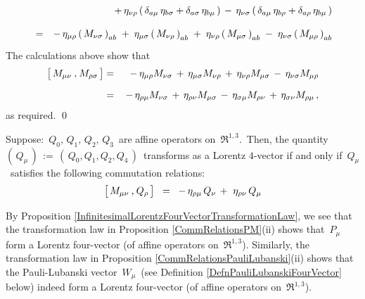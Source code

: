 \begin{enumerate}
\begin{eqnarray*}
	& &
		+\,
		\eta_{\nu\rho}\left(\,
			\delta_{a\mu}\,\eta_{b\sigma}
			+
			\delta_{a\sigma}\,\eta_{b\mu}
			\,\right)
		\,-\,
		\eta_{\nu\sigma}\left(\,
			\delta_{a\mu}\,\eta_{b\rho}
			+
			\delta_{a\rho}\,\eta_{b\mu}
			\,\right)
	\\
	& \overset{{\color{white}\textnormal{\Large$1$}}}{=} &
		-\,\eta_{\mu\rho}\left(\,M_{\nu\sigma}\,\right)_{ab}
		\;+\;
		\eta_{\mu\sigma}\left(\,M_{\nu\rho}\,\right)_{ab}
		\;+\;
		\eta_{\nu\rho}\left(\,M_{\mu\sigma}\,\right)_{ab}
		\;-\;
		\eta_{\nu\sigma}\left(\,M_{\mu\rho}\,\right)_{ab}
	\end{eqnarray*}
	The calculations above show that
	\begin{eqnarray*}
	\left[\,
		M_{\mu\nu}
		\,\overset{{\color{white}1}}{,}\,
		M_{\rho\sigma}
		\,\right]
	& = &
		\,-\,
		\eta_{\mu\rho}M_{\nu\sigma}
		\,+\,
		\eta_{\mu\sigma}M_{\nu\rho}
		\,+\,
		\eta_{\nu\rho}M_{\mu\sigma}
		\,-\,
		\eta_{\nu\sigma}M_{\mu\rho}
	\\
	& \overset{{\color{white}\textnormal{\large$1$}}}{=} &
		\,-\,
		\eta_{\rho\mu}M_{\nu\sigma}
		\,+\,
		\eta_{\rho\nu}M_{\mu\sigma}
		\,-\,
		\eta_{\sigma\mu}M_{\rho\nu}
		\,+\,
		\eta_{\sigma\nu}M_{\rho\mu}\,,
	\end{eqnarray*}
	as required.
	\qed
\end{enumerate}

\vskip 0.5cm
\begin{proposition}
\label{InfinitesimalLorentzFourVectorTransformationLaw}
\mbox{}
\vskip 0.1cm
\noindent
Suppose:
\,$Q_{0},\, Q_{1},\, Q_{2},\, Q_{3}$\,
are affine operators on \,$\Re^{1,3}$.\,
Then, the quantity
\,$\left(\,Q_{\mu}\,\right) \,:=\, \left(\,Q_{0},Q_{1},Q_{2},Q_{4}\,\right)$\,
transforms as a Lorentz $4$-vector if and only if
\,$Q_{\mu}$\, satisfies the following commutation relations:
\begin{equation*}
\left[\,M_{\mu\nu}
	\,\overset{{\color{white}1}}{,}\,
	Q_{\rho}
	\,\right]
\;\; = \;\;
	-\,\eta_{\rho\mu}\,Q_{\nu}
	\,+\,
	\,\eta_{\rho\nu}\,Q_{\mu}
\end{equation*}
\end{proposition}

\vskip 0.3cm
\begin{remark}
\mbox{}
\vskip 0.1cm
\noindent
By Proposition \ref{InfinitesimalLorentzFourVectorTransformationLaw}, we see that
the transformation law in Proposition \ref{CommRelationsPM}(ii)
shows that \,$P_{\mu}$\, form a Lorentz four-vector (of affine operators on \,$\Re^{1,3}$).
Similarly, the transformation law in Proposition \ref{CommRelationsPauliLubanski}(ii)
shows that the Pauli-Lubanski vector \,$W_{\mu}$\,
(see Definition \ref{DefnPauliLubanskiFourVector} below)
indeed form a Lorentz four-vector (of affine operators on \,$\Re^{1,3}$).
\end{remark}

